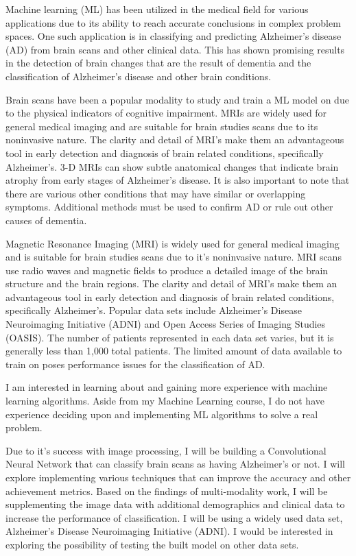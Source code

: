 \documentclass[10pt,twocolumn]{article}
\begin{document}
Machine learning (ML) has been utilized in the medical field for various applications due to its ability to reach accurate conclusions in complex problem spaces. One such application is in classifying and predicting Alzheimer’s disease (AD) from brain scans and other clinical data. This has shown promising results in the detection of brain changes that are the result of dementia and the classification of Alzheimer's disease and other brain conditions. 

Brain scans have been a popular modality to study and train a ML model on due to the physical indicators of cognitive impairment. MRIs are widely used for general medical imaging and are suitable for brain studies scans due to its noninvasive nature. The clarity and detail of MRI's make them an advantageous tool in early detection and diagnosis of brain related conditions, specifically Alzheimer's. 3-D MRIs can show subtle anatomical changes that indicate brain atrophy from early stages of Alzheimer’s disease. It is also important to note that there are various other conditions that may have similar or overlapping symptoms. Additional methods must be used to confirm AD or rule out other causes of dementia.

Magnetic Resonance Imaging (MRI) is widely used for general medical imaging and is suitable for brain studies scans due to it's noninvasive nature. MRI scans use radio waves and magnetic fields to produce a detailed image of the brain structure and the brain regions. The clarity and detail of MRI's make them an advantageous tool in early detection and diagnosis of brain related conditions, specifically Alzheimer's. Popular data sets include Alzheimer's Disease Neuroimaging Initiative (ADNI) and Open Access Series of Imaging Studies (OASIS). The number of patients represented in each data set varies, but it is generally less than 1,000 total patients. The limited amount of data available to train on poses performance issues for the classification of AD. 

I am interested in learning about and gaining more experience with machine learning algorithms. Aside from my Machine Learning course, I do not have experience deciding upon and implementing ML algorithms to solve a real problem. 

Due to it's success with image processing, I will be building a Convolutional Neural Network that can classify brain scans as having Alzheimer's or not. I will explore implementing various techniques that can improve the accuracy and other achievement metrics. Based on the findings of multi-modality work, I will be supplementing the image data with additional demographics and clinical data to increase the performance of classification. I will be using a widely used data set, Alzheimer's Disease Neuroimaging Initiative (ADNI). I would be interested in exploring the possibility of testing the built model on other data sets. 
\end{document}
